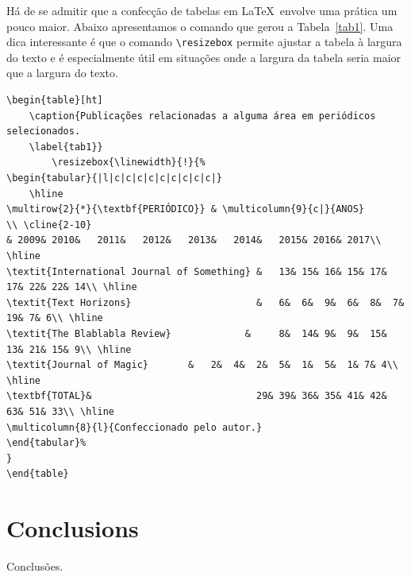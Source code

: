 Há de se admitir que a confecção de tabelas em \LaTeX\ envolve uma prática um pouco maior. Abaixo apresentamos o comando que gerou a
Tabela~\ref{tab1}. Uma dica interessante é que o comando \verb+\resizebox+ permite ajustar a tabela à largura do texto e é
especialmente útil em situações onde a largura da tabela seria maior que a largura do texto.
\begin{scriptsize}
\begin{verbatim}
\begin{table}[ht] 
    \caption{Publicações relacionadas a alguma área em periódicos selecionados.
    \label{tab1}}
		\resizebox{\linewidth}{!}{%
\begin{tabular}{|l|c|c|c|c|c|c|c|c|c|}
    \hline
\multirow{2}{*}{\textbf{PERIÓDICO}} & \multicolumn{9}{c|}{ANOS}
\\ \cline{2-10}
& 2009&	2010&	2011&	2012&	2013&	2014&	2015& 2016& 2017\\ \hline
\textit{International Journal of Something} &	13&	15&	16&	15&	17&	17&	22& 22& 14\\ \hline 
\textit{Text Horizons}               		& 	6&	6&	9&	6&	8&	7&	19& 7& 6\\ \hline 
\textit{The Blablabla Review}             & 	8&	14&	9&	9&	15&	13&	21& 15& 9\\ \hline 
\textit{Journal of Magic}		&	2&	4&	2&	5&	1&	5&	1& 7& 4\\ \hline 
\textbf{TOTAL}&                           	29&	39&	36&	35&	41&	42&	63& 51& 33\\ \hline 
\multicolumn{8}{l}{Confeccionado pelo autor.}
\end{tabular}%
}
\end{table}
\end{verbatim}
\end{scriptsize}

\begin{table}[ht] 
    \caption{Publicações relacionadas a alguma área em periódicos selecionados.
    \label{tab1}}
\end{table}


\chapter{Conclusions}

Conclusões.

